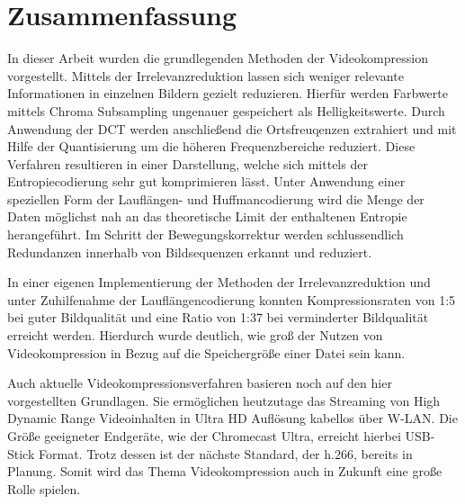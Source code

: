 \chapter{Zusammenfassung}
\label{kap:Zusammenfassung}

In dieser Arbeit wurden die grundlegenden Methoden der Videokompression vorgestellt. Mittels der Irrelevanzreduktion lassen sich weniger relevante Informationen in einzelnen Bildern gezielt reduzieren. Hierfür werden Farbwerte mittels Chroma Subsampling ungenauer gespeichert als Helligkeitswerte. Durch Anwendung der DCT werden anschließend die Ortsfreuqenzen extrahiert und mit Hilfe der Quantisierung um die höheren Frequenzbereiche reduziert. Diese Verfahren resultieren in einer Darstellung, welche sich mittels der Entropiecodierung sehr gut komprimieren lässt. Unter Anwendung einer speziellen Form der Lauflängen- und Huffmancodierung wird die Menge der Daten möglichst nah an das theoretische Limit der enthaltenen Entropie herangeführt. Im Schritt der Bewegungskorrektur werden schlussendlich Redundanzen innerhalb von Bildsequenzen erkannt und reduziert.

In einer eigenen Implementierung der Methoden der Irrelevanzreduktion und unter Zuhilfenahme der Lauflängencodierung konnten Kompressionsraten von 1:5 bei guter Bildqualität und eine Ratio von 1:37 bei verminderter Bildqualität erreicht werden. Hierdurch wurde deutlich, wie groß der Nutzen von Videokompression in Bezug auf die Speichergröße einer Datei sein kann.

Auch aktuelle Videokompressionsverfahren basieren noch auf den hier vorgestellten Grundlagen. Sie ermöglichen heutzutage das Streaming von High Dynamic Range Videoinhalten in Ultra HD Auflösung kabellos über W-LAN. Die Größe geeigneter Endgeräte, wie der Chromecast Ultra, erreicht hierbei USB-Stick Format. Trotz dessen ist der nächste Standard, der h.266, bereits in Planung. Somit wird das Thema Videokompression auch in Zukunft eine große Rolle spielen.
